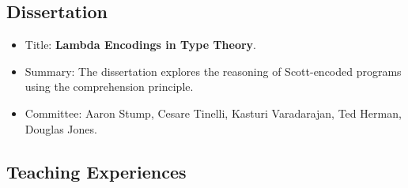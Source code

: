 \documentclass{article}
\begin{document}

\subsection*{Dissertation}
\begin{itemize}
\item Title: \textbf{Lambda Encodings in Type Theory}.  

\item Summary: The dissertation explores the reasoning
  of Scott-encoded programs using the comprehension principle.
   
\item Committee: Aaron Stump, Cesare Tinelli, Kasturi Varadarajan, Ted Herman, Douglas Jones.
     
\end{itemize}

\subsection*{Teaching Experiences}
\end{document}
